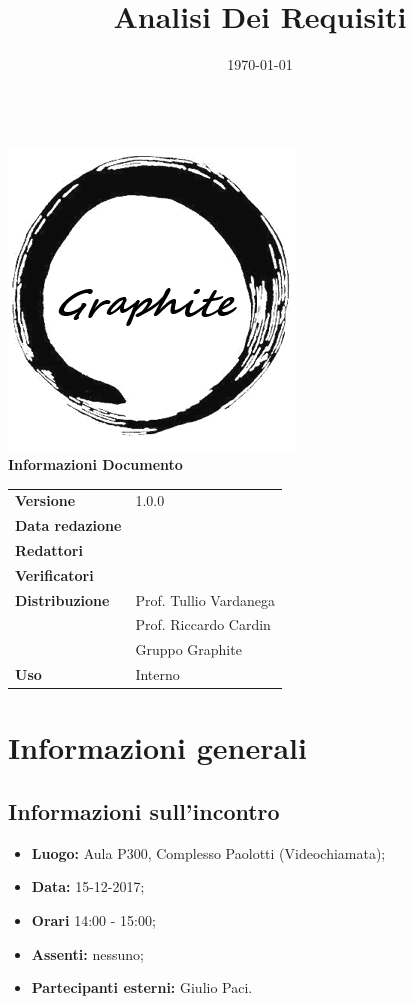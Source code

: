 \documentclass[openany,12pt,a4paper]{article}
\title{Analisi Dei Requisiti}
\author{}
\date{\today}
\begin{document}
	\makeatletter
	\begin{titlepage}
		\setlength{\headsep}{0pt}  
		\begin{center}
			{\huge \bfseries  \@title }\\[10ex]
			\includegraphics[width=0.5\linewidth]{Logo.png}\\[1em]
			\textbf{\Large Informazioni Documento} \\[2em]
			\bgroup
			\def\arraystretch{1.5}
			\begin{tabular}{l|l}
				\textbf{Versione} & 1.0.0 \\
				\textbf{Data redazione} & \large \@date \\
				\textbf{Redattori} &  \\
				\textbf{Verificatori} &  \\
				\textbf{Distribuzione} & Prof. Tullio Vardanega \\
				 & Prof. Riccardo Cardin \\
				 & Gruppo Graphite \\
				\textbf{Uso} & Interno \\
			\end{tabular}
		\egroup
		\end{center}
	\end{titlepage}
	\makeatother

	\thispagestyle{empty}
	\newpage
	
	\section{Informazioni generali}
	
	\subsection{Informazioni sull'incontro}
	
	\begin{itemize} 
	    \item \textbf{Luogo:} Aula P300, Complesso Paolotti (Videochiamata);
	    \item \textbf{Data:} 15-12-2017;
	    \item \textbf{Orari} 14:00 - 15:00;
	    \item \textbf{Assenti:} nessuno;
	    \item \textbf{Partecipanti esterni:} Giulio Paci.
	\end{itemize}
	
\end{document}
